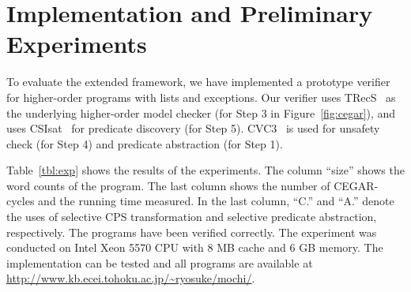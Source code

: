 \vspace{-2mm}

\section{Implementation and Preliminary Experiments}
\label{sec:experiments}

\vspace{-1mm}

To evaluate the extended framework, we have implemented a prototype
verifier for higher-order programs with lists and exceptions.
Our verifier uses TRecS~\cite{KobayashiPOPL2009,KobayashiPPDP2009} as
the underlying higher-order model checker (for Step 3 in
Figure~\ref{fig:cegar}), and uses CSIsat~\cite{Beyer2008} for predicate
discovery (for Step 5).  CVC3~\cite{Barrett2007} is used for unsafety
check (for Step 4) and predicate abstraction (for Step 1).

Table~\ref{tbl:exp} shows the results of the experiments.  The column
``size'' shows the word counts of the program.  The last column shows
the number of CEGAR-cycles and the running time measured.  In the last
column, ``C.'' and ``A.'' denote the uses of selective CPS
transformation and selective predicate abstraction, respectively.  The
programs have been verified correctly.  The experiment was conducted on
Intel Xeon 5570 CPU with 8 MB cache and 6 GB memory.  The implementation
can be tested and all programs are available at
\url{http://www.kb.ecei.tohoku.ac.jp/~ryosuke/mochi/}.

